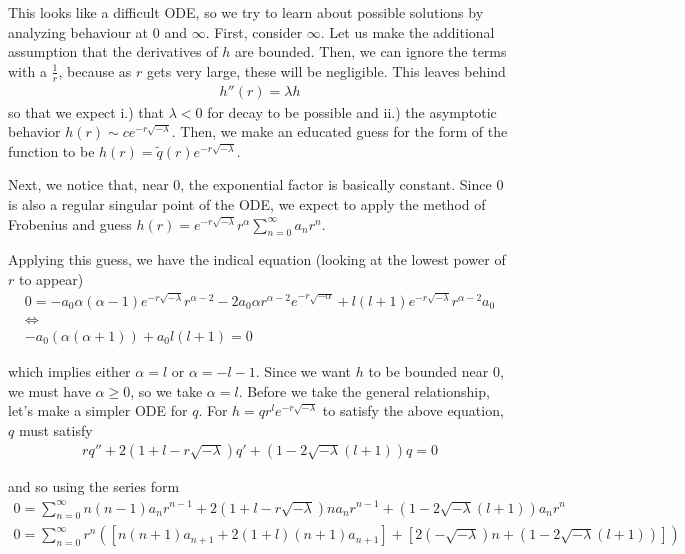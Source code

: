 \documentclass{article}
\begin{document}
	This looks like a difficult ODE, so we try to learn about possible solutions by analyzing behaviour at $0$ and $\infty$. First, consider $\infty$. Let us make the additional assumption that the derivatives of $h$ are bounded. Then, we can ignore the terms with a $\frac{1}{r}$, because as $r$ gets very large, these will be negligible. This leaves behind
	\begin{align*}
		h''(r) = \lambda h
	\end{align*}
	so that we expect i.) that $\lambda < 0$ for decay to be possible and ii.) the asymptotic behavior $h(r) \sim c e^{-r\sqrt{-\lambda}}$. Then, we make an educated guess for the form of the function to be $h(r) = \tilde{q}(r)e^{-r\sqrt{-\lambda}}$. 
	
	Next, we notice that, near $0$, the exponential factor is basically constant. Since $0$ is also a regular singular point of the ODE, we expect to apply the method of Frobenius and guess $h(r) = e^{-r\sqrt{-\lambda}} r^{\alpha} \sum_{n=0}^{\infty} a_n r^{n}$. 
		
	Applying this guess, we have the indical equation (looking at the lowest power of $r$ to appear)
	\begin{align*}
		0=-a_0 \alpha(\alpha - 1)e^{-r\sqrt{-\lambda}}r^{\alpha - 2} - 2a_{0} \alpha r^{\alpha-2}e^{-r\sqrt{-\alpha}} + l(l+1)e^{-r\sqrt{-\lambda}}r^{\alpha-2}a_0  \\
		\Leftrightarrow \\
		-a_0(\alpha(\alpha +1)) + a_0 l(l+1)=0
	\end{align*}
	
	which implies either $\alpha = l$ or $\alpha = -l-1$. Since we want $h$ to be bounded near $0$, we must have $\alpha \geq 0$, so we take $\alpha = l$. Before we take the general relationship, let's make a simpler ODE for $q$. For $h = qr^{l}e^{-r\sqrt{-\lambda}}$ to satisfy the above equation, $q$ must satisfy 
	\begin{align*}
		rq'' + 2(1+l-r\sqrt{-\lambda})q' + (1-2\sqrt{-\lambda}(l+1))q=0
	\end{align*}
	
	and so using the series form
	\begin{align*}
		0 = \sum_{n=0}^{\infty} n(n-1)a_{n}r^{n-1} +2(1+l-r\sqrt{-\lambda}) na_{n}r^{n-1} + (1-2\sqrt{-\lambda}(l+1)) a_{n}r^{n}\\
		0 = \sum_{n=0}^{\infty} r^{n}\left( [n(n+1)a_{n+1} +2(1+l)(n+1)a_{n+1}] + [2(-\sqrt{-\lambda})n +(1-2\sqrt{-\lambda}(l+1))]\right) 
	\end{align*}
	
\end{document}
